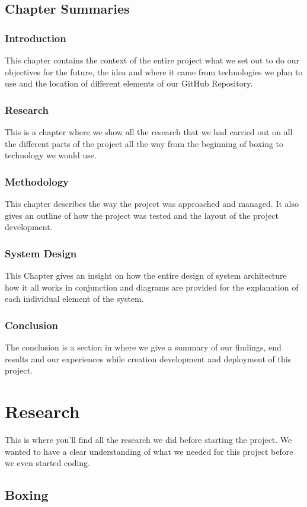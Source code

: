 \documentclass[a4paper,12pt]{report}
\begin{document}
\section{Chapter Summaries}
\subsection{Introduction}
This chapter contains the context of the entire project what we set out to do our objectives for the future, the idea and where it came from technologies we plan to use and the location of different elements of our GitHub Repository. 

\subsection{Research}
This is a chapter where we show all the research that we had carried out on all the different parts of the project all the way from the beginning of boxing to technology we would use.
\subsection{Methodology}
This chapter describes the way the project was approached and managed. It also gives an outline of how the project was tested and the layout of the project development.
\subsection{System Design}
This Chapter gives an insight on how the entire design of system architecture how it all works in conjunction and diagrams are provided for the explanation of each individual element of the system. 
\subsection{Conclusion}
The conclusion is a section in where we give a summary of our findings, end results and our experiences while creation development and deployment of this project.


\chapter{Research}
This is where you'll find all the research we did before starting the project. We wanted to have a clear understanding of what we needed for this project before we even started coding. 
\section{Boxing}
\end{document}

